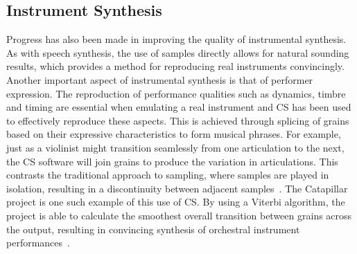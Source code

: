 \documentclass[titlepage]{scrartcl}
\begin{document}
    \subsection*{Instrument Synthesis}
    Progress has also been made in improving the quality of instrumental
    synthesis. As with speech synthesis, the use of samples directly allows for
    natural sounding results, which provides a method for reproducing real
    instruments convincingly. Another important aspect of instrumental synthesis is that of performer
    expression. The reproduction of performance qualities such as dynamics,
    timbre and timing are essential when emulating a real instrument and CS has
    been used to effectively reproduce these aspects. This is achieved through
    splicing of grains based on their expressive characteristics to form
    musical phrases.  For example, just as a violinist might transition
    seamlessly from one articulation to the next, the CS software will join
    grains to produce the variation in articulations. This contrasts the
    traditional approach to sampling, where samples are played in isolation,
    resulting in a discontinuity between adjacent samples~\parencite[p.82]{Lindemann2007}. 
    The Catapillar project is one such example of this use of CS. 
    By using a Viterbi algorithm, the project is able to calculate the
    smoothest overall transition between grains across the output, resulting
    in convincing synthesis of orchestral instrument performances~\parencite[p.5]{Schwarz2003}.
\end{document}

